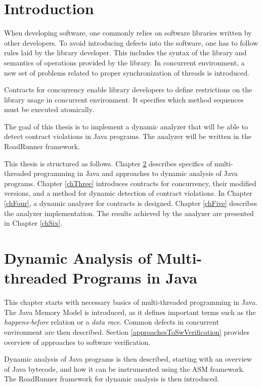 
\chapter{Introduction}

When developing software, one commonly relies on software libraries written by
other developers. To avoid introducing defects into the software, one has to
follow rules laid by the library developer. This includes the syntax of the
library and semantics of operations provided by the library. In concurrent
environment, a new set of problems related to proper synchronization of threads
is introduced.

Contracts for concurrency enable library developers to define restrictions on
the library usage in concurrent environment. It specifies which method sequences
must be executed atomically.

The goal of this thesis is to implement a dynamic analyzer that will be able to
detect contract violations in Java programs. The analyzer will be written in the
RoadRunner framework.

\todo{}

This thesis is structured as follows. Chapter \ref{chTwo} describes specifics of
multi-threaded programming in Java and approaches to dynamic analysis of Java
programs. Chapter \ref{chThree} introduces contracts for concurrency, their
modified versions, and a method for dynamic detection of contract violations. In
Chapter \ref{chFour}, a dynamic analyzer for contracts is designed. Chapter
\ref{chFive} describes the analyzer implementation. The results achieved by the
analyzer are presented in Chapter \ref{chSix}.



\chapter{Dynamic Analysis of Multi-threaded Programs in Java}
\label{chTwo}

This chapter starts with necessary basics of multi-threaded programming in Java.
The Java Memory Model is introduced, as it defines important terms such as the
\emph{happens-before} relation or a \emph{data race}. Common defects in
concurrent environment are then described. Section
\ref{approachesToSwVerification} provides overview of approaches to software
verification.

Dynamic analysis of Java programs is then described, starting with an overview
of Java bytecode, and how it can be instrumented using the ASM framework. The
RoadRunner framework for dynamic analysis is then introduced.


